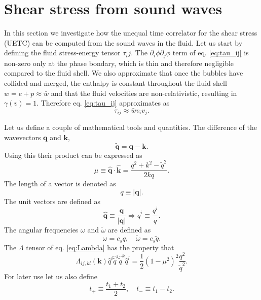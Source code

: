 \section{Shear stress from sound waves}
\label{shear_stress}
In this section we investigate how the unequal time correlator for the shear stress (UETC) can be computed from the sound waves in the fluid.
Let us start by defining the fluid stress-energy tensor $\tau_ij$.
The $\partial_i \phi \partial_j \phi$ term of eq. \eqref{eq:tau_ij} is non-zero only at the phase bondary,
which is thin and therefore negligible compared to the fluid shell.
We also approximate that once the bubbles have collided and merged,
the enthalpy is constant throughout the fluid shell $w = e + p \approx \bar{w}$
and that the fluid velocities are non-relativistic, resulting in $\gamma(v) = 1$.
Therefore eq. \eqref{eq:tau_ij} approximates as
\cite[eq. 3.12]{hindmarsh_gw_pt_2019}
\begin{equation}
\tau_{ij} \approx \bar{w} v_i v_j.
\label{eq:tau_ij_approx}
\end{equation}

Let us define a couple of mathematical tools and quantities.
The difference of the wavevectors $\mathbf{q}$ and $\mathbf{k}$,
\begin{equation}
\tilde{\mathbf{q}} = \mathbf{q} - \mathbf{k}.
\label{eq:tilde_q}
\end{equation}
Using this their product can be expressed as
\begin{equation}
\mu \equiv \hat{\mathbf{q}} \cdot \hat{\mathbf{k}} = \frac{q^2 + k^2 - \tilde{q}^2}{2kq}.
\label{eq:mu}
\end{equation}
The length of a vector is denoted as
\begin{equation}
q \equiv |\mathbf{q}|.
\end{equation}
The unit vectors are defined as
\begin{equation}
\hat{\mathbf{q}} \equiv \frac{\mathbf{q}}{|\mathbf{q}|} \Rightarrow
\hat{q}^i \equiv \frac{q^i}{q}.
\end{equation}
The angular frequencies $\omega$ and $\tilde{\omega}$ are defined as
\cite[p. 10]{hindmarsh_gw_pt_2019}
\begin{equation}
\omega = c_s q, \quad \tilde{\omega} = c_s \tilde{q}.
\end{equation}
The $\Lambda$ tensor of eq. \eqref{eq:Lambda} has the property that
\cite[eq. 3.17]{hindmarsh_gw_pt_2019}
\begin{equation}
\Lambda_{ij,kl}(\mathbf{k}) \hat{q}^i \hat{\tilde{q}}^j \hat{\tilde{q}}^k \hat{q}^l = \frac{1}{2}(1 - \mu^2)^2 \frac{q^2}{\tilde{q}^2}.
\end{equation}
For later use let us also define
\cite[p. 11]{hindmarsh_gw_pt_2019}
\begin{equation}
t_+ \equiv \frac{t_1 + t_2}{2}, \quad t_- \equiv t_1 - t_2.
\label{eq:t_plus_minus}
\end{equation}


